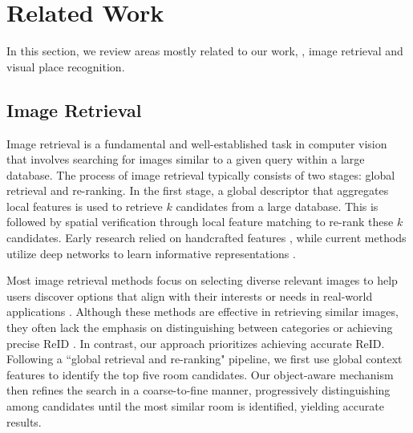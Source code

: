 \section{Related Work}
\label{sec:related_work}

In this section, we review areas mostly related to our work, \ie, image retrieval and visual place recognition.

\subsection{Image Retrieval}

Image retrieval is a fundamental and well-established task in computer vision that involves searching for images similar to a given query within a large database.
The process of image retrieval typically consists of two stages: global retrieval and re-ranking. In the first stage, a global descriptor that aggregates local features is used to retrieve $k$ candidates from a large database. This is followed by spatial verification through local feature matching to re-rank these $k$ candidates. Early research relied on handcrafted features \cite{Lowe2004DistinctiveIF, BAY2008346}, while current methods utilize deep networks to learn informative representations \cite{cao2020unifyingdeeplocalglobal, radenović2018finetuningcnnimageretrieval}.

Most image retrieval methods focus on selecting diverse relevant images to help users discover options that align with their interests or needs in real-world applications \cite{Wan2014DeepLF}. Although these methods are effective in retrieving similar images, they often lack the emphasis on distinguishing between categories or achieving precise ReID \cite{10.1145/1348246.1348248}.
In \mbox{contrast}, our approach prioritizes achieving accurate ReID. Following a ``global retrieval and re-ranking" pipeline, we first use global context features to identify the top five room candidates. Our object-aware mechanism then refines the search in a coarse-to-fine manner, progressively distinguishing among candidates until the most similar room is \mbox{identified}, yielding accurate results.

